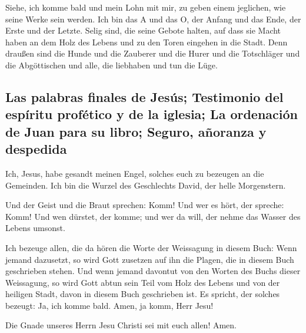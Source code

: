  Siehe, ich komme bald und mein Lohn mit mir, zu geben
einem jeglichen, wie seine Werke sein werden.  Ich bin
das A und das O, der Anfang und das Ende, der Erste und der Letzte.
 Selig sind, die seine Gebote halten, auf dass sie Macht
haben an dem Holz des Lebens und zu den Toren eingehen in die Stadt.
 Denn draußen sind die Hunde und die Zauberer und die
Hurer und die Totschläger und die Abgöttischen und alle, die liebhaben
und tun die Lüge.

\hypertarget{las-palabras-finales-de-jesuxfas-testimonio-del-espuxedritu-profuxe9tico-y-de-la-iglesia-la-ordenaciuxf3n-de-juan-para-su-libro-seguro-auxf1oranza-y-despedida}{%
\subsection{Las palabras finales de Jesús; Testimonio del espíritu
profético y de la iglesia; La ordenación de Juan para su libro; Seguro,
añoranza y
despedida}\label{las-palabras-finales-de-jesuxfas-testimonio-del-espuxedritu-profuxe9tico-y-de-la-iglesia-la-ordenaciuxf3n-de-juan-para-su-libro-seguro-auxf1oranza-y-despedida}}

 Ich, Jesus, habe gesandt meinen Engel, solches euch zu
bezeugen an die Gemeinden. Ich bin die Wurzel des Geschlechts David, der
helle Morgenstern.

 Und der Geist und die Braut sprechen: Komm! Und wer es
hört, der spreche: Komm! Und wen dürstet, der komme; und wer da will,
der nehme das Wasser des Lebens umsonst.

 Ich bezeuge allen, die da hören die Worte der Weissagung
in diesem Buch: Wenn jemand dazusetzt, so wird Gott zusetzen auf ihn die
Plagen, die in diesem Buch geschrieben stehen.  Und wenn
jemand davontut von den Worten des Buchs dieser Weissagung, so wird Gott
abtun sein Teil vom Holz des Lebens und von der heiligen Stadt, davon in
diesem Buch geschrieben ist.  Es spricht, der solches
bezeugt: Ja, ich komme bald. Amen, ja komm, Herr Jesu!

 Die Gnade unseres Herrn Jesu Christi sei mit euch allen!
Amen.
